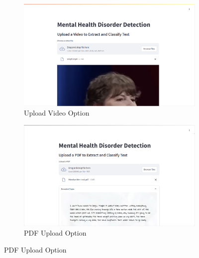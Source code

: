 \begin{figure}[h!]
    \centering
    \begin{subfigure}[b]{0.495\textwidth}
        \centering
        \includegraphics[width=\textwidth]{App Images/12 Interface.png}
        \caption*{Upload Video Option}
        \label{fig:06i4}
    \end{subfigure}
    \hfill
    \begin{subfigure}[b]{0.495\textwidth}
        \centering
        \includegraphics[width=\textwidth]{App Images/20 Interface.png}
        \caption*{PDF Upload Option}
        \label{fig:10i23445}
    \end{subfigure}
    \label{fig:app_interfaces_upload}
\end{figure}

\vspace{-2em}

